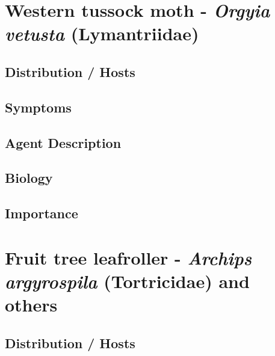\documentclass[
]{book}
\begin{document}
\section*{\texorpdfstring{Western tussock moth - \emph{Orgyia vetusta} (Lymantriidae)}{Western tussock moth - Orgyia vetusta (Lymantriidae)}}\label{western-tussock-moth---orgyia-vetusta-lymantriidae}

\subsection*{Distribution / Hosts}\label{distribution-hosts-4}

\subsection*{Symptoms}\label{symptoms-4}

\subsection*{Agent Description}\label{agent-description-4}

\subsection*{Biology}\label{biology-4}

\subsection*{Importance}\label{importance-4}

\section*{\texorpdfstring{Fruit tree leafroller - \emph{Archips argyrospila} (Tortricidae) and others}{Fruit tree leafroller - Archips argyrospila (Tortricidae) and others}}\label{fruit-tree-leafroller---archips-argyrospila-tortricidae-and-others}

\subsection*{Distribution / Hosts}\label{distribution-hosts-5}
\end{document}
